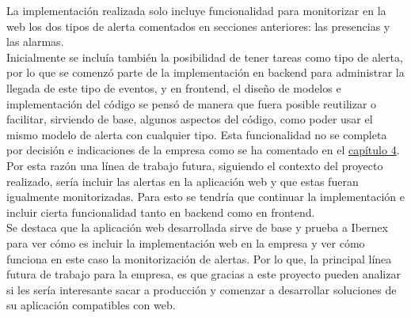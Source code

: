 La implementación realizada solo incluye funcionalidad para monitorizar en la web los dos tipos de alerta comentados en secciones anteriores: las presencias y las alarmas.\\

Inicialmente se incluía también la posibilidad de tener tareas como tipo de alerta, por lo que se comenzó parte de la implementación en backend para administrar la llegada de este tipo de eventos, y en frontend, el diseño de modelos e implementación del código se pensó de manera que fuera posible reutilizar o facilitar, sirviendo de base, algunos aspectos del código, como poder usar el mismo modelo de alerta con cualquier tipo. Esta funcionalidad no se completa por decisión e indicaciones de la empresa como se ha comentado en el \hyperref[section-gestion-proyecto]{capítulo 4}.
Por esta razón una línea de trabajo futura, siguiendo el contexto del proyecto realizado, sería incluir las alertas en la aplicación web y que estas fueran igualmente monitorizadas. Para esto se tendría que continuar la implementación e incluir cierta funcionalidad tanto en backend como en frontend.\\

Se destaca que la aplicación web desarrollada sirve de base y prueba a Ibernex para ver cómo es incluir la implementación web en la empresa y ver cómo funciona en este caso la monitorización de alertas. Por lo que, la principal línea futura de trabajo para la empresa, es que gracias a este proyecto pueden analizar si les sería interesante sacar a producción y comenzar a desarrollar soluciones de su aplicación compatibles con web.
